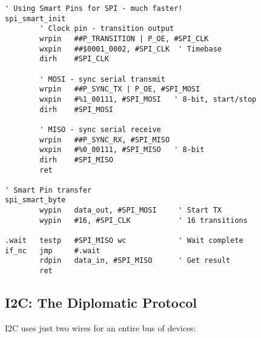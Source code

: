 \documentclass[11pt]{book}
\begin{document}
\begin{lstlisting}
' Using Smart Pins for SPI - much faster!
spi_smart_init
        ' Clock pin - transition output
        wrpin   ##P_TRANSITION | P_OE, #SPI_CLK
        wxpin   ##$0001_0002, #SPI_CLK  ' Timebase
        dirh    #SPI_CLK
        
        ' MOSI - sync serial transmit
        wrpin   ##P_SYNC_TX | P_OE, #SPI_MOSI
        wxpin   #%1_00111, #SPI_MOSI   ' 8-bit, start/stop
        dirh    #SPI_MOSI
        
        ' MISO - sync serial receive
        wrpin   ##P_SYNC_RX, #SPI_MISO
        wxpin   #%0_00111, #SPI_MISO   ' 8-bit
        dirh    #SPI_MISO
        ret

' Smart Pin transfer
spi_smart_byte
        wypin   data_out, #SPI_MOSI     ' Start TX
        wypin   #16, #SPI_CLK           ' 16 transitions
        
.wait   testp   #SPI_MISO wc            ' Wait complete
if_nc   jmp     #.wait
        rdpin   data_in, #SPI_MISO      ' Get result
        ret
\end{lstlisting}

\hypertarget{i2c-the-diplomatic-protocol}{%
\subsection{I2C: The Diplomatic
Protocol}\label{i2c-the-diplomatic-protocol}}

I2C uses just two wires for an entire bus of devices:
\end{document}
